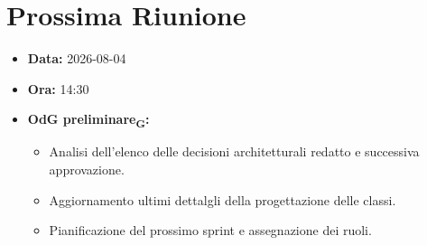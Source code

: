 \section{Prossima Riunione}
\begin{itemize}
	\item \textbf{Data:} 2026-08-04
	\item \textbf{Ora:} 14:30
	\item \textbf{OdG preliminare\textsubscript{G}:}
	\begin{itemize}
		\item Analisi dell’elenco delle decisioni architetturali redatto e successiva approvazione.
        \item Aggiornamento ultimi dettalgli della progettazione delle classi.
        \item Pianificazione del prossimo sprint e assegnazione dei ruoli.
	\end{itemize}
\end{itemize}